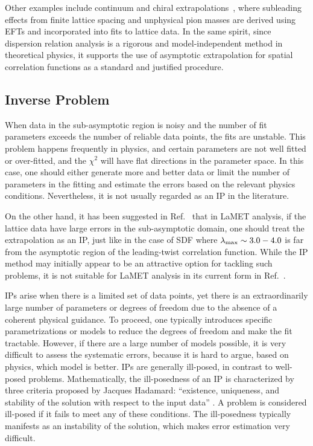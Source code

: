 \documentclass[prd,twocolumn,superscriptaddress,preprintnumbers,showpacs,nofootinbib,notitlepage,floatfix]{revtex4-2}
\begin{document}
Other examples include continuum and chiral extrapolations~\cite{Chen:2001eg,Arndt:2001ye,Chang:2018uxx}, where subleading effects from finite lattice spacing and unphysical pion masses are derived using EFTs and incorporated into fits to lattice data. In the same spirit, since dispersion relation analysis is a rigorous and model-independent method in theoretical physics, it supports the use of asymptotic extrapolation for spatial correlation functions as a standard and justified procedure.

\subsection{Inverse Problem}
\label{sec:def-inv}

When data in the sub-asymptotic region is noisy and the number of fit parameters exceeds the number of reliable data points, the fits are unstable. This problem happens frequently in physics, and certain parameters are not well fitted or over-fitted, and the $\chi^2$ will have flat directions in the parameter space. In this case, one should either generate more and better data or limit the number of parameters in the fitting and estimate the errors based on the relevant physics conditions. Nevertheless, it is not usually regarded as an IP in the literature. 

On the other hand, it has been suggested in Ref.~\cite{Dutrieux:2025jed} that in LaMET analysis, if the lattice data have large errors in the sub-asymptotic domain, one should treat the extrapolation as an IP, just like in the case of SDF where $\lambda_{\rm max} \sim 3.0-4.0$ is far from the asymptotic region of the leading-twist correlation function. While the IP method may initially appear to be an attractive option for tackling such problems, it is not suitable for LaMET analysis in its current form in Ref.~\cite{Dutrieux:2025jed}.

IPs arise when there is a limited set of data points, yet there is an extraordinarily large number of parameters or degrees of freedom due to the absence of a coherent physical guidance. To proceed, one typically introduces specific parametrizations or models to reduce the degrees of freedom and make the fit tractable. However, if there are a large number of models possible, it is very difficult to assess the systematic errors, because it is hard to argue, based on physics, which model is better. IPs are generally ill-posed, in contrast to well-posed problems. Mathematically, the ill-posedness of an IP is characterized by three criteria proposed by Jacques Hadamard: ``existence, uniqueness, and stability of the solution with respect to the input data'' \cite{Hadamard:1923,Kirsch:2011}. A problem is considered ill-posed if it fails to meet any of these conditions. The ill-posedness typically manifests as an instability of the solution, which makes error estimation very difficult. 
\end{document}
